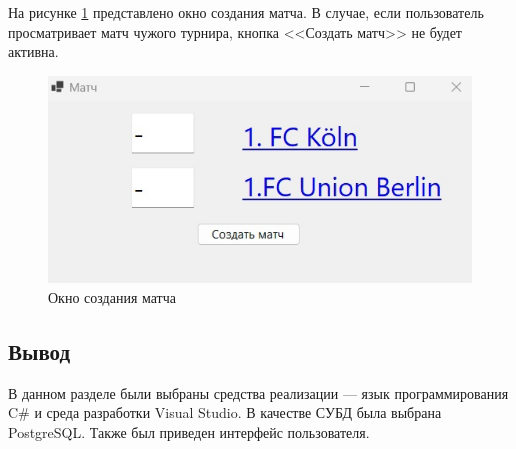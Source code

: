 На рисунке \ref{img:matc} представлено окно создания матча. В случае, если пользователь просматривает матч чужого турнира, кнопка <<Создать матч>> не будет активна.
\begin{figure}
  \centering
  \includegraphics[scale=0.5]{inc/matchcr.jpg}
  \caption{Окно создания матча}
  \label{img:matc}
\end{figure}

\subsection*{Вывод}
В данном разделе были выбраны средства реализации --- язык программирования C\# и среда разработки Visual Studio. В качестве СУБД была выбрана PostgreSQL. Также был приведен интерфейс пользователя.